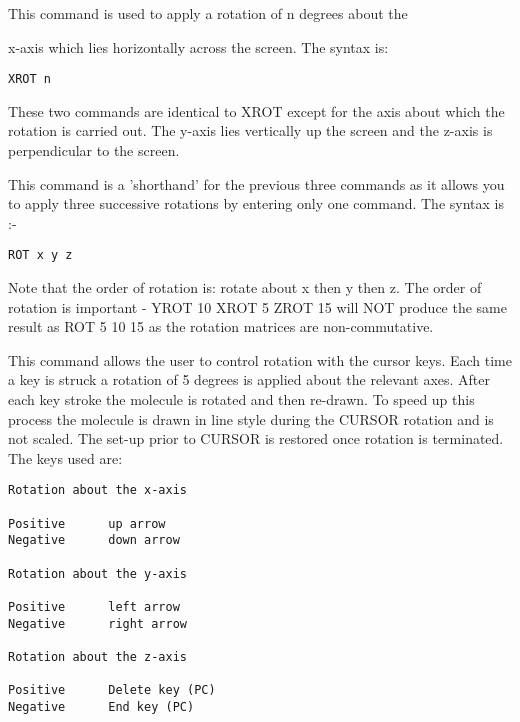 \documentclass[10pt,a4paper]{report}
\begin{document}
\bigskip{}




This command is used to apply a rotation of n degrees about the

x-axis which lies horizontally across the screen. The syntax is:
\small\begin{verbatim}
XROT n
\end{verbatim}\normalsize




\bigskip{}




\bigskip{}




These two commands are identical to XROT except for the axis
about
which the rotation is carried out. The y-axis lies vertically up
the
screen and the z-axis is perpendicular to the screen.


\bigskip{}




This command is a 'shorthand' for the previous three commands
as it
allows you to apply three successive rotations by entering only
one
command. The syntax is :-
\small\begin{verbatim}
ROT x y z
\end{verbatim}\normalsize


Note that the order of rotation is: rotate about x then y then
z. The
order of rotation is important - YROT 10 XROT 5 ZROT 15 will NOT
produce
the same result as ROT 5 10 15 as the rotation matrices are
non-commutative.


\bigskip{}




This command allows the user to control rotation with the
cursor keys.
Each time a key is struck a rotation of 5 degrees is applied
about the
relevant axes. After each key stroke the molecule is rotated and
then
re-drawn. To speed up this process the molecule is drawn in line style
during the
CURSOR rotation and is not scaled. The set-up prior to CURSOR is
restored
once rotation is terminated. The keys used are:

\small\begin{verbatim}
Rotation about the x-axis

Positive      up arrow
Negative      down arrow

Rotation about the y-axis

Positive      left arrow
Negative      right arrow

Rotation about the z-axis

Positive      Delete key (PC)
Negative      End key (PC)
\end{verbatim}\normalsize
\end{document}

